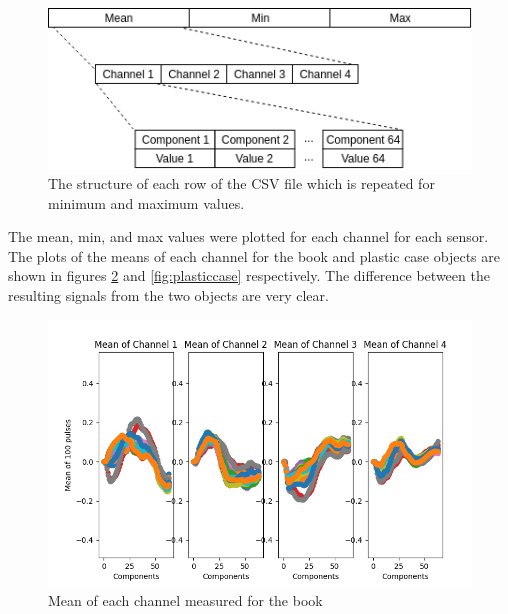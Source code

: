 \documentclass[12pt]{article}
\begin{document}
\begin{figure}[!ht]
	\centering
	\includegraphics[width=\linewidth]{images/structure}
	\caption{The structure of each row of the CSV file which is repeated for minimum and maximum values.}
	\label{fig:structure}
\end{figure}

The mean, min, and max values were plotted for each channel for each sensor. The plots of the means of each channel for the book and plastic case objects are shown in figures \ref{fig:book} and \ref{fig:plasticcase} respectively. The difference between the resulting signals from the two objects are very clear.

\begin{figure}[!ht]
	\centering
	\includegraphics[width=\linewidth]{images/book}
	\caption{Mean of each channel measured for the book}
	\label{fig:book}
\end{figure}
\end{document}
